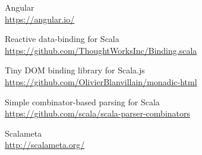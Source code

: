 \begin{thebibliography}{99}
Angular\\
\url{https://angular.io/}

Reactive data-binding for Scala\\
\url{https://github.com/ThoughtWorksInc/Binding.scala}

Tiny DOM binding library for Scala.js\\
\url{https://github.com/OlivierBlanvillain/monadic-html}

Simple combinator-based parsing for Scala\\
\url{https://github.com/scala/scala-parser-combinators}

Scalameta\\
\url{http://scalameta.org/}



\end{thebibliography}